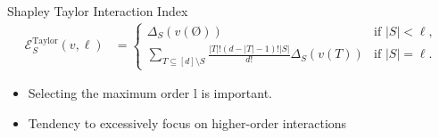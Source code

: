 \documentclass[10pt]{beamer}
\newcommand{\f}{v}
\newcommand{\ex}{\Expl}
\def\Expl{\mathcal{E}}
\begin{document}
\begin{frame}
    \begin{mydefbox}{Shapley Taylor Interaction Index}
        {\small
        \begin{align*}
            \ex_S^{\text{Taylor}}(\f,\ell) &= 
            \begin{cases}
                \Delta_S(\f(\text{\O})) & \text{if } |S| < \ell, \\
                \sum_{T \subseteq [d] \setminus S} \frac{|T|!(d-|T|-1)!|S|}{d!} \Delta_S(\f(T)) & \text{if } |S| = \ell.
            \end{cases}
            \tag{7}
        \end{align*}
        }
    \end{mydefbox}
    \vspace{1.5em}
    \begin{itemize}[label=\scalebox{0.5}{$\blacksquare$}]
        \item Selecting the maximum order l is important.
        \item Tendency to excessively focus on higher-order interactions
    \end{itemize}
\end{frame}

\end{document}
